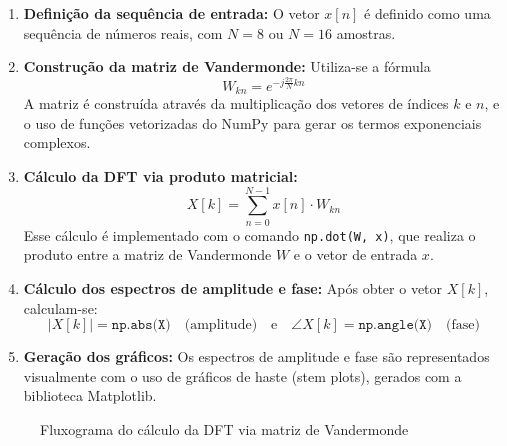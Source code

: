 \documentclass[12pt]{article}
\begin{document}
\begin{enumerate}
    \item \textbf{Definição da sequência de entrada:} O vetor $x[n]$ é definido como uma sequência de números reais, com $N=8$ ou $N=16$ amostras.
    
    \item \textbf{Construção da matriz de Vandermonde:} Utiliza-se a fórmula
    \[
    W_{kn} = e^{-j\frac{2\pi}{N}kn}
    \]
    A matriz é construída através da multiplicação dos vetores de índices $k$ e $n$, e o uso de funções vetorizadas do NumPy para gerar os termos exponenciais complexos.
    
    \item \textbf{Cálculo da DFT via produto matricial:}
    \[
    X[k] = \sum_{n=0}^{N-1} x[n] \cdot W_{kn}
    \]
    Esse cálculo é implementado com o comando \texttt{np.dot(W, x)}, que realiza o produto entre a matriz de Vandermonde $W$ e o vetor de entrada $x$.
    
    \item \textbf{Cálculo dos espectros de amplitude e fase:} Após obter o vetor $X[k]$, calculam-se:
    \[
    |X[k]| = \texttt{np.abs(X)} \quad \text{(amplitude)} \quad \text{e} \quad \angle X[k] = \texttt{np.angle(X)} \quad \text{(fase)}
    \]
    
    \item \textbf{Geração dos gráficos:} Os espectros de amplitude e fase são representados visualmente com o uso de gráficos de haste (stem plots), gerados com a biblioteca Matplotlib.
\end{enumerate}

\begin{figure}[H]
\centering
{}
\caption{Fluxograma do cálculo da DFT via matriz de Vandermonde}
\end{figure}
\end{document}
